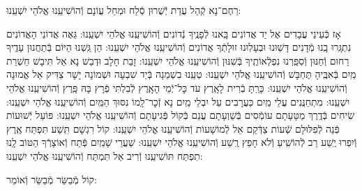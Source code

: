 \documentclass[twoside, openany, parskip=half, 11pt]{book}
\begin{document}
\shatzvkahal
רַחֶם־נָא קְֿהַל עֲדַת יְֿשֻׁרוּן סְֿלַח וּמְחַל עֲוֹנָם וְֿהוֹשִׁיעֵֽנוּ אֱלֹהֵי יִשְׁעֵֽנוּ:

\begin{small}
	אָז כְּֿעֵינֵי עֲבָדִים אֶל יַד אֲדוֹנִים בָּֽאנוּ לְֿפָנֶֽיךָ נְֿדוֹנִים וְֿהוֹשִׁיעֵֽנוּ אֱלֹהֵי יִשְׁעֵֽנוּ:
	גֵּאֶה אֲדוֹנֵי הָאֲדוֹנִים נִתְגָּֽרוּ בָֽנוּ מְֿדָנִים דָּשֽׁוּנוּ וּבְעָלֽוּנוּ זוּלָתְֿךָ אֲדוֹנִים וְֿהוֹשִׁיעֵֽנוּ אֱלֹהֵי יִשְׁעֵֽנוּ:
	הֵן גַּֽשְׁנוּ הַיּוֹם בְּֿתַחֲנוּן עָדֶֽיךָ רַחוּם וְֿחַנּוּן וְֿסִפַּֽרְנוּ נִפְלְֿאוֹתֶֽיךָ בְּֿשִׁנּוּן וְֿהוֹשִׁיעֵֽנוּ אֱלֹהֵי יִשְׁעֵֽנוּ:
	זָבַת חָלָב וּדְבַשׁ נָא אַל תִּיבָשׁ חַשְׁרַת מַֽיִם בְּֿאִבֶּֽיהָ תֶּחְבָּשׁ וְֿהוֹשִׁיעֵֽנוּ אֱלֹהֵי יִשְׁעֵֽנוּ:
	טְעֵֽנוּ בִשְׁמֵנָה בְּֿיַד שִׁבְעָה וּשְׁמוֹנָה יָשָׁר צַדִּיק אֵל אֱמוּנָה וְֿהוֹשִׁיעֵֽנוּ אֱלֹהֵי יִשְׁעֵֽנוּ:
	כָּרַֽתָּ בְֿרִית לָאָֽרֶץ עֹד כׇּל־יְֿמֵי הָאָֽרֶץ לְֿבִלְתִּי פְֿרָץ בָּהּ פָּֽרֶץ וְֿהוֹשִׁיעֵֽנוּ אֱלֹהֵי יִשְׁעֵֽנוּ:
	מִתְחַנֲּנִים עֲלֵי מַֽיִם כַּעֲרָבִים עַל יִבְלֵי מַֽיִם נָא זְֿכׇר־לָֽמוֹ נִסּוּךְ הַמַּֽיִם וְֿהוֹשִׁיעֵֽנוּ אֱלֹהֵי יִשְׁעֵֽנוּ:
	שִׂיחִים בְּֿדֶֽרֶךְ מַטָּעָתָם עוֹמְֿסִים בְּֿשַׁוְעָתָם עֲנֵם בְּֿקוֹל פְּֿגִיעָתָם וְֿהוֹשִׁיעֵֽנוּ אֱלֹהֵי יִשְׁעֵֽנוּ:
	פּוֹעֵל יְֿשׁוּעוֹת פְּֿנֵה לְֿפִלּוּלָם שְֿׁעוֹת צַדְּֿקֵם אֵל לְֿמוֹשָׁעוֹת וְֿהוֹשִׁיעֵֽנוּ אֱלֹהֵי יִשְׁעֵֽנוּ:
	קוֹל רִגְשָׁם תִּֽשַׁע תִּפְתַּח אֶֽרֶץ וְֿיִפְרוּ יֶֽשַׁע רַב לְֿהוֹשִֽׁיעַ וְֿלֹא חָפֵץ רֶֽשַׁע וְֿהוֹשִׁיעֵֽנוּ אֱלֹהֵי יִשְׁעֵֽנוּ:
	שַׁעֲרֵי שָׁמַֽיִם פְּֿתַח וְֿאוֹצָרְֿךָ הַטּוֹב לָֽנוּ תִפְתַּח תּוֹשִׁיעֵֽנוּ וְֿרִיב אַל תִּמְתַּח וְֿהוֹשִׁיעֵֽנוּ אֱלֹהֵי יִשְׁעֵֽנוּ:
	
\end{small}

\begin{large}
	קוֹל מְֿבַשֵּׂר מְֿבַשֵּׂר וְֿאוֹמֵר:
	
\end{large}
\end{document}
